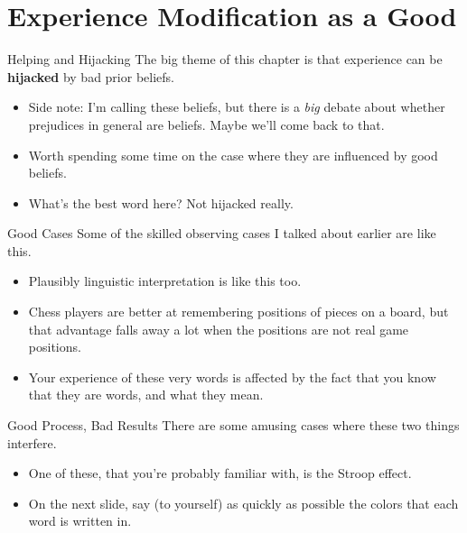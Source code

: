 \documentclass[
  17pt,
  letterpaper,
  ignorenonframetext,
  aspectratio=169,
  handout,
  xcolor={dvipsnames}]{beamer}
\providecommand{\tightlist}{%
  \setlength{\itemsep}{0pt}\setlength{\parskip}{0pt}}\usepackage{longtable,booktabs,array}
\begin{document}
\hypertarget{experience-modification-as-a-good}{%
\section{Experience Modification as a
Good}\label{experience-modification-as-a-good}}

\begin{frame}{Helping and Hijacking}
\protect\hypertarget{helping-and-hijacking}{}
The big theme of this chapter is that experience can be
\textbf{hijacked} by bad prior beliefs.

\begin{itemize}[<+->]
\tightlist
\item
  Side note: I'm calling these beliefs, but there is a \emph{big} debate
  about whether prejudices in general are beliefs. Maybe we'll come back
  to that.
\item
  Worth spending some time on the case where they are influenced by good
  beliefs.
\item
  What's the best word here? Not hijacked really.
\end{itemize}
\end{frame}

\begin{frame}{Good Cases}
\protect\hypertarget{good-cases}{}
Some of the skilled observing cases I talked about earlier are like
this.

\begin{itemize}[<+->]
\tightlist
\item
  Plausibly linguistic interpretation is like this too.
\item
  Chess players are better at remembering positions of pieces on a
  board, but that advantage falls away a lot when the positions are not
  real game positions.
\item
  Your experience of these very words is affected by the fact that you
  know that they are words, and what they mean.
\end{itemize}
\end{frame}

\begin{frame}{Good Process, Bad Results}
\protect\hypertarget{good-process-bad-results}{}
There are some amusing cases where these two things interfere.

\begin{itemize}[<+->]
\tightlist
\item
  One of these, that you're probably familiar with, is the Stroop
  effect.
\item
  On the next slide, say (to yourself) as quickly as possible the colors
  that each word is written in.
\end{itemize}
\end{frame}
\end{document}
